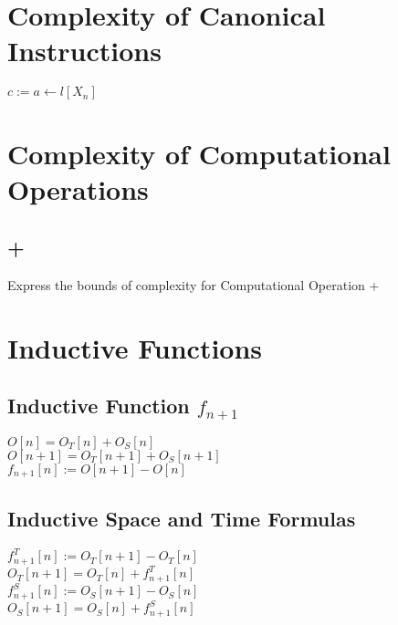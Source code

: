\documentclass[11pt]{article}
\begin{document}
\section{Complexity of Canonical Instructions}
\begin{center}
$
c := a \leftarrow l[X_n]
$
\end{center}

\section{Complexity of Computational Operations}
\subsection{+}
Express the bounds of complexity for Computational Operation +


\newpage
\section{Inductive Functions}














\subsection{Inductive Function $f_{n+1}$}
\begin{center}
\vspace{3mm}
$
O[n] = O_T[n] + O_S[n]
$
\\ \vspace{2mm}
$
O[n+1] = O_T[n+1] + O_S[n+1]
$
\\ \vspace{4mm}
$
f_{n+1}[n] := O[n+1] - O[n]
$
\end{center}










\subsection{Inductive Space and Time Formulas}
\begin{center}
$
f^T_{n+1}[n] := O_T[n+1] - O_T[n]
$
\\ \vspace{2mm}
$
O_T[n+1] = O_T[n] + f^T_{n+1}[n]
$
\\ \vspace{2mm}
$
f^S_{n+1}[n] := O_S[n+1] - O_S[n]
$
\\ \vspace{2mm}
$
O_S[n+1] = O_S[n] + f^S_{n+1}[n]
$

\end{center}
\end{document}

